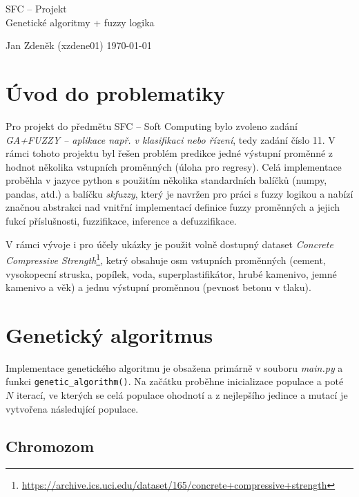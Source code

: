 \documentclass{article}
\begin{document}
\begin{titlepage}
    \centering
    \vspace*{3cm}

    \Huge SFC -- Projekt \\[0.5cm]
    \huge Genetické algoritmy + fuzzy logika

    \vfill %

    \begin{flushleft}
        \Large Jan Zdeněk (xzdene01) \hfill \today
    \end{flushleft}
\end{titlepage}

\section{Úvod do problematiky}

Pro projekt do předmětu SFC -- Soft Computing bylo zvoleno zadání \emph{GA+FUZZY -- aplikace např. v klasifikaci nebo řízení}, tedy zadání číslo 11. V rámci tohoto projektu byl řešen problém predikce jedné výstupní proměnné z hodnot několika vstupních proměnných (úloha pro regresy). Celá implementace proběhla v jazyce python s použitím několika standardních balíčků (numpy, pandas, atd.) a balíčku \emph{skfuzzy}, který je navržen pro práci s fuzzy logikou a nabízí značnou abstrakci nad vnitřní implementací definice fuzzy proměnných a jejich fukcí příslušnosti, fuzzifikace, inference a defuzzifikace.

V rámci vývoje i pro účely ukázky je použit volně dostupný dataset \emph{Concrete Compressive Strength}\footnote{\url{https://archive.ics.uci.edu/dataset/165/concrete+compressive+strength}}, ketrý obsahuje osm vstupních proměnných (cement, vysokopecní struska, popílek, voda, superplastifikátor, hrubé kamenivo, jemné kamenivo a věk) a jednu výstupní proměnnou (pevnost betonu v tlaku).

\section{Genetický algoritmus}

Implementace genetického algoritmu je obsažena primárně v souboru \emph{main.py} a funkci \texttt{genetic\_algorithm()}. Na začátku proběhne inicializace populace a poté $N$ iterací, ve kterých se celá populace ohodnotí a z nejlepšího jedince a mutací je vytvořena následující populace.

\subsection{Chromozom}
\end{document}
